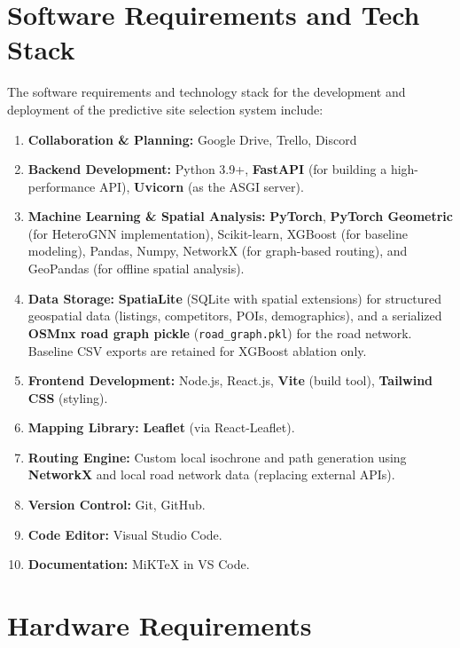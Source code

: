 \section{Software Requirements and Tech Stack}

The software requirements and technology stack for the development and deployment of the predictive site selection system include:
\begin{enumerate}
    \item \textbf{Collaboration \& Planning:} Google Drive, Trello, Discord
    \item \textbf{Backend Development:} Python 3.9+, \textbf{FastAPI} (for building a high-performance API), \textbf{Uvicorn} (as the ASGI server).
    \item \textbf{Machine Learning \& Spatial Analysis:} \textbf{PyTorch}, \textbf{PyTorch Geometric} (for HeteroGNN implementation), Scikit-learn, XGBoost (for baseline modeling), Pandas, Numpy, NetworkX (for graph-based routing), and GeoPandas (for offline spatial analysis).
    \item \textbf{Data Storage:} \textbf{SpatiaLite} (SQLite with spatial extensions) for structured geospatial data (listings, competitors, POIs, demographics), and a serialized \textbf{OSMnx road graph pickle} (\texttt{road\_graph.pkl}) for the road network. Baseline CSV exports are retained for XGBoost ablation only.
    \item \textbf{Frontend Development:} Node.js, React.js, \textbf{Vite} (build tool), \textbf{Tailwind CSS} (styling).
    \item \textbf{Mapping Library:} \textbf{Leaflet} (via React-Leaflet).
    \item \textbf{Routing Engine:} Custom local isochrone and path generation using \textbf{NetworkX} and local road network data (replacing external APIs).
    \item \textbf{Version Control:} Git, GitHub.
    \item \textbf{Code Editor:} Visual Studio Code.
    \item \textbf{Documentation:} MiKTeX in VS Code.
\end{enumerate}


\section{Hardware Requirements}

